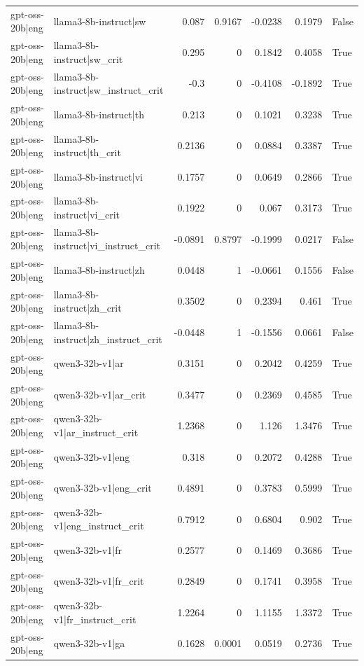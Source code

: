 \begin{table}
\begin{tabular}{l l r r r r l}
gpt-oss-20b|eng & llama3-8b-instruct|sw & 0.087 & 0.9167 & -0.0238 & 0.1979 & False \\
gpt-oss-20b|eng & llama3-8b-instruct|sw_crit & 0.295 & 0 & 0.1842 & 0.4058 & True \\
gpt-oss-20b|eng & llama3-8b-instruct|sw_instruct_crit & -0.3 & 0 & -0.4108 & -0.1892 & True \\
gpt-oss-20b|eng & llama3-8b-instruct|th & 0.213 & 0 & 0.1021 & 0.3238 & True \\
gpt-oss-20b|eng & llama3-8b-instruct|th_crit & 0.2136 & 0 & 0.0884 & 0.3387 & True \\
gpt-oss-20b|eng & llama3-8b-instruct|vi & 0.1757 & 0 & 0.0649 & 0.2866 & True \\
gpt-oss-20b|eng & llama3-8b-instruct|vi_crit & 0.1922 & 0 & 0.067 & 0.3173 & True \\
gpt-oss-20b|eng & llama3-8b-instruct|vi_instruct_crit & -0.0891 & 0.8797 & -0.1999 & 0.0217 & False \\
gpt-oss-20b|eng & llama3-8b-instruct|zh & 0.0448 & 1 & -0.0661 & 0.1556 & False \\
gpt-oss-20b|eng & llama3-8b-instruct|zh_crit & 0.3502 & 0 & 0.2394 & 0.461 & True \\
gpt-oss-20b|eng & llama3-8b-instruct|zh_instruct_crit & -0.0448 & 1 & -0.1556 & 0.0661 & False \\
gpt-oss-20b|eng & qwen3-32b-v1|ar & 0.3151 & 0 & 0.2042 & 0.4259 & True \\
gpt-oss-20b|eng & qwen3-32b-v1|ar_crit & 0.3477 & 0 & 0.2369 & 0.4585 & True \\
gpt-oss-20b|eng & qwen3-32b-v1|ar_instruct_crit & 1.2368 & 0 & 1.126 & 1.3476 & True \\
gpt-oss-20b|eng & qwen3-32b-v1|eng & 0.318 & 0 & 0.2072 & 0.4288 & True \\
gpt-oss-20b|eng & qwen3-32b-v1|eng_crit & 0.4891 & 0 & 0.3783 & 0.5999 & True \\
gpt-oss-20b|eng & qwen3-32b-v1|eng_instruct_crit & 0.7912 & 0 & 0.6804 & 0.902 & True \\
gpt-oss-20b|eng & qwen3-32b-v1|fr & 0.2577 & 0 & 0.1469 & 0.3686 & True \\
gpt-oss-20b|eng & qwen3-32b-v1|fr_crit & 0.2849 & 0 & 0.1741 & 0.3958 & True \\
gpt-oss-20b|eng & qwen3-32b-v1|fr_instruct_crit & 1.2264 & 0 & 1.1155 & 1.3372 & True \\
gpt-oss-20b|eng & qwen3-32b-v1|ga & 0.1628 & 0.0001 & 0.0519 & 0.2736 & True \\

\end{tabular}
\end{table}
